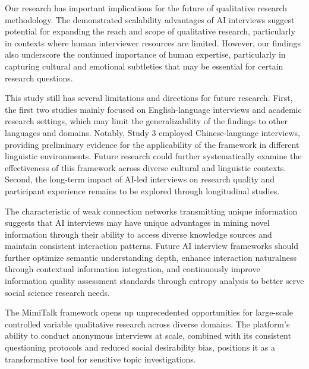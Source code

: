 \documentclass[sigchi,nonacm,manuscript]{acmart}
\begin{document}
Our research has important implications for the future of qualitative research methodology. The demonstrated scalability advantages of AI interviews suggest potential for expanding the reach and scope of qualitative research, particularly in contexts where human interviewer resources are limited. However, our findings also underscore the continued importance of human expertise, particularly in capturing cultural and emotional subtleties that may be essential for certain research questions.

This study still has several limitations and directions for future research. First, the first two studies mainly focused on English-language interviews and academic research settings, which may limit the generalizability of the findings to other languages and domains. Notably, Study 3 employed Chinese-language interviews, providing preliminary evidence for the applicability of the framework in different linguistic environments. Future research could further systematically examine the effectiveness of this framework across diverse cultural and linguistic contexts. Second, the long-term impact of AI-led interviews on research quality and participant experience remains to be explored through longitudinal studies.

The characteristic of weak connection networks transmitting unique information \citep{aralWhatExactlyNovelty2023} suggests that AI interviews may have unique advantages in mining novel information through their ability to access diverse knowledge sources and maintain consistent interaction patterns. Future AI interview frameworks should further optimize semantic understanding depth, enhance interaction naturalness through contextual information integration, and continuously improve information quality assessment standards through entropy analysis to better serve social science research needs.

The MimiTalk framework opens up unprecedented opportunities for large-scale controlled variable qualitative research across diverse domains. The platform's ability to conduct anonymous interviews at scale, combined with its consistent questioning protocols and reduced social desirability bias, positions it as a transformative tool for sensitive topic investigations. 
\end{document}
